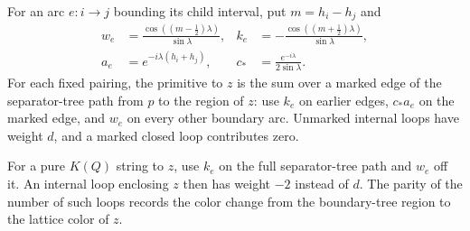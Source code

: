 \begin{lemma}\label{cur:tree-weights}
For an arc $e:i\to j$ bounding its child interval, put
$m=h_i-h_j$ and
\begin{equation}\label{cur:weights}
 \begin{aligned}
 w_e&=\frac{\cos((m-\tfrac12)\lambda)}{\sin\lambda},&
 k_e&=-\frac{\cos((m+\tfrac12)\lambda)}{\sin\lambda},\\
 a_e&=e^{-i\lambda(h_i+h_j)},&
 c_*&=\frac{e^{-i\lambda}}{2\sin\lambda}.
 \end{aligned}
\end{equation}
For each fixed pairing, the primitive to $z$ is the sum over a
marked edge of the separator-tree path from $p$ to the region of
$z$: use $k_e$ on earlier edges, $c_*a_e$ on the marked edge, and
$w_e$ on every other boundary arc. Unmarked internal loops have
weight $d$, and a marked closed loop contributes zero.

For a pure $K(Q)$ string to $z$, use $k_e$ on the full
separator-tree path and $w_e$ off it. An internal loop enclosing
$z$ then has weight $-2$ instead of $d$. The parity of the number
of such loops records the color change from the boundary-tree
region to the lattice color of $z$.
\end{lemma}

